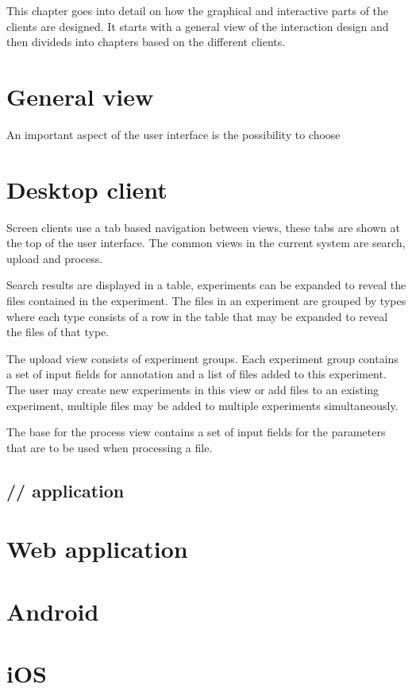 
This chapter goes into detail on how the graphical and interactive parts of the clients are designed. It starts with a general view of the interaction design and then divideds into chapters based on the different clients.

\section{General view}
An important aspect of the user interface is the possibility to choose 


\section{Desktop client}
Screen clients use a tab based navigation between views, these tabs are shown at the top of the user interface. The common views in the current system are search, upload and process.

Search results are displayed in a table, experiments can be expanded to reveal the files contained in the experiment. The files in an experiment are grouped by types where each type consists of a row in the table that may be expanded to reveal the files of that type.

The upload view consists of experiment groups. Each experiment group contains a set of input fields for annotation and a list of files added to this experiment. The user may create new experiments in this view or add files to an existing experiment, multiple files may be added to multiple experiments simultaneously.

The base for the process view contains a set of input fields for the parameters that are to be used when processing a file.

\FloatBarrier
\subsection{// application}


\FloatBarrier
\section{Web application}



\FloatBarrier
\section{Android}


\FloatBarrier
\section{iOS}

